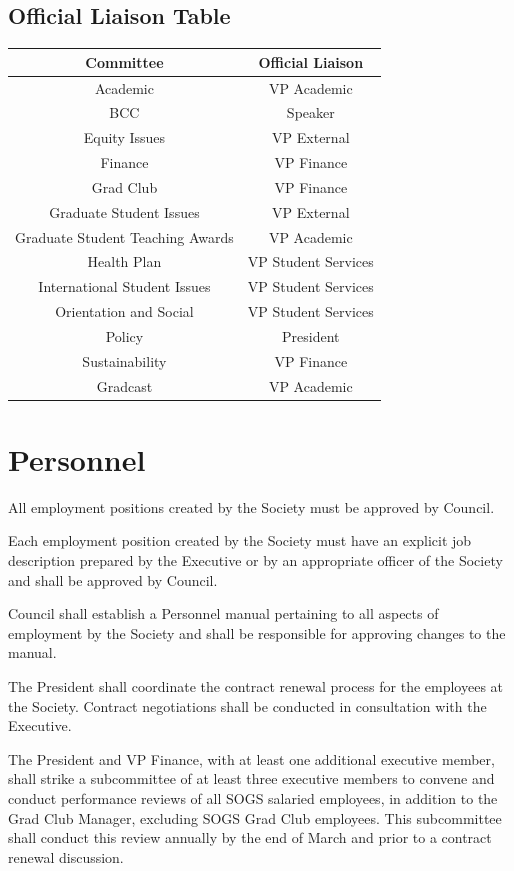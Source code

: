 \subsection{Official Liaison Table}
\begin{center}
    \begin{tabular}{  c | c }

    Committee & Official Liaison  \\ \hline 
    Academic & VP Academic \\ 
    BCC & Speaker \\ 
    Equity Issues & VP External \\ 
    Finance & VP Finance  \\ 
    Grad Club & VP Finance  \\ 
    Graduate Student Issues & VP External \\ 
    Graduate Student Teaching Awards & VP Academic \\ 
    Health Plan & VP Student Services \\ 
    International Student Issues &  VP Student Services \\ 
    Orientation and Social & VP Student Services \\  
    Policy & President \\ 
    Sustainability &VP Finance \\ 
    Gradcast & VP Academic \\ 

\end{tabular}
\end{center}

\newpage

\section{Personnel}
\begin{longenum}[ label*=\thesection.\arabic*., align=left]
	\item All employment positions created by the Society must be approved by Council.
    \item Each employment position created by the Society must have an explicit job description prepared by the Executive or by an appropriate officer of the Society and shall be approved by Council. 
    \item Council shall establish a Personnel manual pertaining to all aspects of employment by the Society and shall be responsible for approving changes to the manual.
    \item The President shall coordinate the contract renewal process for the employees at the Society. Contract negotiations shall be conducted in consultation with the Executive.
    \item The President and VP Finance, with at least one additional executive member, shall strike a subcommittee of at least three executive members to convene and conduct performance reviews of all SOGS salaried employees, in addition to the Grad Club Manager, excluding SOGS Grad Club employees. This subcommittee shall conduct this review annually by the end of March and prior to a contract renewal discussion.
\end{longenum}
\newpage

